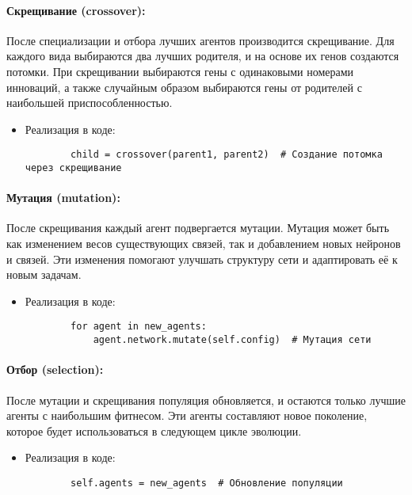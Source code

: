 \documentclass[a4paper,12pt]{article}
\begin{document}
\paragraph{Скрещивание (crossover):}

После специализации и отбора лучших агентов производится скрещивание. Для каждого вида выбираются два лучших родителя, и на основе их генов создаются потомки. При скрещивании выбираются гены с одинаковыми номерами инноваций, а также случайным образом выбираются гены от родителей с наибольшей приспособленностью.

\begin{itemize}
	\item[] Реализация в коде:
	\begin{lstlisting}
		child = crossover(parent1, parent2)  # Создание потомка через скрещивание
	\end{lstlisting}
\end{itemize}

\paragraph{Мутация (mutation):}

После скрещивания каждый агент подвергается мутации. Мутация может быть как изменением весов существующих связей, так и добавлением новых нейронов и связей. Эти изменения помогают улучшать структуру сети и адаптировать её к новым задачам.

\begin{itemize}
	\item[] Реализация в коде:
	\begin{lstlisting}
		for agent in new_agents:
			agent.network.mutate(self.config)  # Мутация сети
	\end{lstlisting}
\end{itemize}

\paragraph{Отбор (selection):}

После мутации и скрещивания популяция обновляется, и остаются только лучшие агенты с наибольшим фитнесом. Эти агенты составляют новое поколение, которое будет использоваться в следующем цикле эволюции.

\begin{itemize}
	\item[] Реализация в коде:
	\begin{lstlisting}
		self.agents = new_agents  # Обновление популяции
	\end{lstlisting}
\end{itemize}
\end{document}

